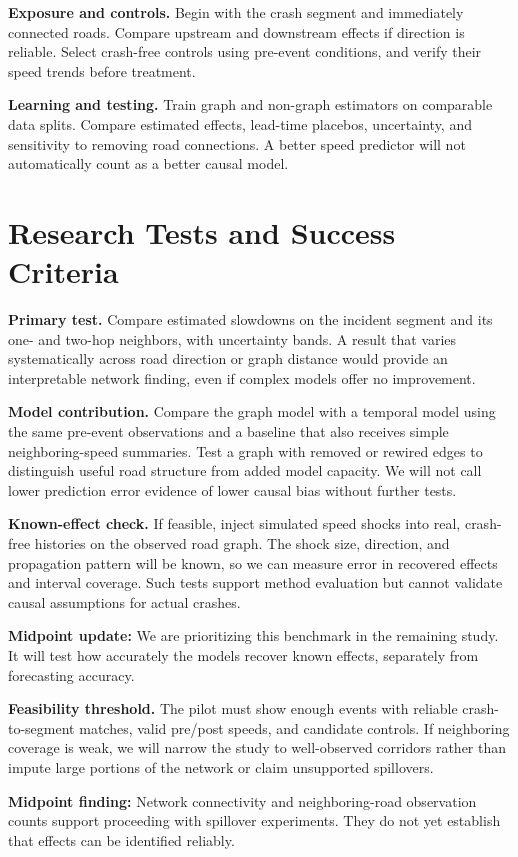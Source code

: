 \documentclass[sigconf,nonacm]{acmart}
\begin{document}
\textbf{Exposure and controls.} Begin with the crash segment and
immediately connected roads. Compare upstream and downstream effects
if direction is reliable. Select crash-free controls using pre-event
conditions, and verify their speed trends before treatment.

\textbf{Learning and testing.} Train graph and non-graph estimators on
comparable data splits. Compare estimated effects, lead-time placebos,
uncertainty, and sensitivity to removing road connections. A better
speed predictor will not automatically count as a better causal model.

\section{Research Tests and Success Criteria}
\textbf{Primary test.} Compare estimated slowdowns on the incident
segment and its one- and two-hop neighbors, with uncertainty bands.
A result that varies systematically across road direction or graph
distance would provide an interpretable network finding, even if
complex models offer no improvement.

\textbf{Model contribution.} Compare the graph model with a temporal
model using the same pre-event observations and a baseline that also
receives simple neighboring-speed summaries. Test a graph with removed
or rewired edges to distinguish useful road structure from added model
capacity. We will not call lower prediction error evidence of lower
causal bias without further tests.

\textbf{Known-effect check.} If feasible, inject simulated speed
shocks into real, crash-free histories on the observed road graph. The
shock size, direction, and propagation pattern will be known, so we
can measure error in recovered effects and interval coverage. Such
tests support method evaluation but cannot validate causal assumptions
for actual crashes.

{\textbf{Midpoint update:} We are prioritizing this
benchmark in the remaining study. It will test how accurately the
models recover known effects, separately from forecasting accuracy.}

\textbf{Feasibility threshold.} The pilot must show enough events with
reliable crash-to-segment matches, valid pre/post speeds, and candidate
controls. If neighboring coverage is weak, we will narrow the study
to well-observed corridors rather than impute large portions of the
network or claim unsupported spillovers.

{\textbf{Midpoint finding:} Network connectivity
and neighboring-road observation counts support proceeding with
spillover experiments. They do not yet establish that effects can be
identified reliably.}
\end{document}
